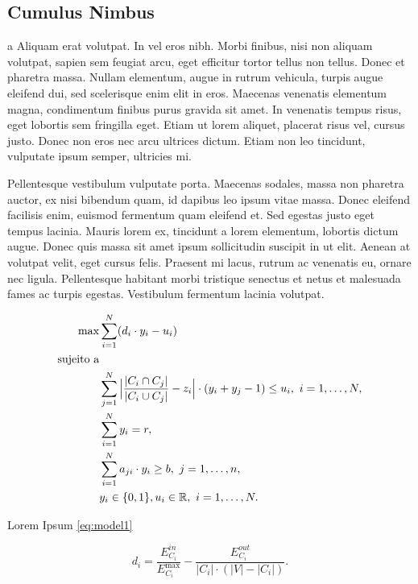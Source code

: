 \documentclass[superscriptaddress,a0]{sciposter}
\begin{document}
\begin{multicols}{3}
\section{Cumulus Nimbus}
a
Aliquam erat volutpat. In vel eros nibh. Morbi finibus, nisi non aliquam volutpat, sapien sem feugiat arcu, eget efficitur tortor tellus non tellus. Donec et pharetra massa. Nullam elementum, augue in rutrum vehicula, turpis augue eleifend dui, sed scelerisque enim elit in eros. Maecenas venenatis elementum magna, condimentum finibus purus gravida sit amet. In venenatis tempus risus, eget lobortis sem fringilla eget. Etiam ut lorem aliquet, placerat risus vel, cursus justo. Donec non eros nec arcu ultrices dictum. Etiam non leo tincidunt, vulputate ipsum semper, ultricies mi.

Pellentesque vestibulum vulputate porta. Maecenas sodales, massa non pharetra auctor, ex nisi bibendum quam, id dapibus leo ipsum vitae massa. Donec eleifend facilisis enim, euismod fermentum quam eleifend et. Sed egestas justo eget tempus lacinia. Mauris lorem ex, tincidunt a lorem elementum, lobortis dictum augue. Donec quis massa sit amet ipsum sollicitudin suscipit in ut elit. Aenean at volutpat velit, eget cursus felis. Praesent mi lacus, rutrum ac venenatis eu, ornare nec ligula. Pellentesque habitant morbi tristique senectus et netus et malesuada fames ac turpis egestas. Vestibulum fermentum lacinia volutpat.

\begin{subequations}\allowdisplaybreaks
  \label{eq:model1}
  \begin{align}
    \max & \sum\limits_{i = 1}^N (d_i \cdot y_i - u_i) \label{eq:ocm1:of}\\
    \text{sujeito a} & \nonumber \\
    & \sum\limits_{j = 1}^N \Big|\frac{|C_i \cap C_j|}{|C_i \cup C_j|} -
      z_i\Big| \cdot (y_i + y_j - 1) \leq u_i, \ i = 1, \dots, N,
      \label{eq:ocm1:cons1} \\
    & \sum\limits_{i = 1}^N y_i = r, \label{eq:ocm1:cons2} \\
    & \sum\limits_{i = 1}^N a_{ji} \cdot y_i \geq b, \ j = 1, \dots,
      n, \label{eq:ocm1:cons3} \\
    & y_i \in \{0, 1\}, u_i \in \mathbb{R}, \ i = 1, \dots, N.
      \label{eq:ocm1:cons4}
  \end{align}
\end{subequations}

    Lorem Ipsum \ref{eq:model1}

    \begin{equation}
    \label{eq:clst_goodness}
    d_i = \frac{E_{C_i}^{in}}{E_{C_i}^{\max}} -
        \frac{E_{C_i}^{out}}{|C_i| \cdot (|V| - |C_i|)}.
    \end{equation}


\end{multicols}
\end{document}
